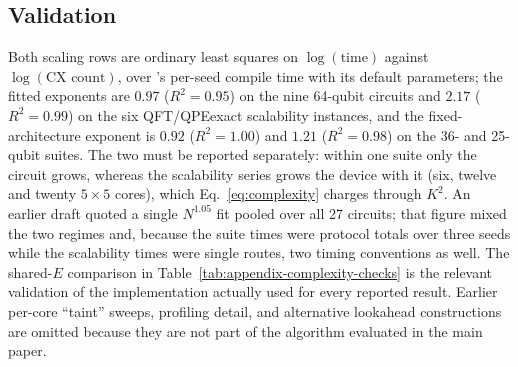 \subsection{Validation}
\label{app:complexity_valid}

\begin{table}[t]
\centering
\caption{Implementation checks supporting the complexity argument.}
\label{tab:appendix-complexity-checks}
\small
{}
\end{table}

Both scaling rows are ordinary least squares on $\log(\text{time})$
against $\log(\text{CX count})$, over \dSABRE{}'s per-seed compile time with
its default parameters; the fitted exponents are $0.97$ ($R^2=0.95$) on the
nine 64-qubit circuits and $2.17$ ($R^2=0.99$) on the six QFT/QPEexact
scalability instances, and the fixed-architecture exponent is $0.92$
($R^2=1.00$) and $1.21$ ($R^2=0.98$) on the 36- and 25-qubit suites.  The two
must be reported separately: within one suite only the circuit grows, whereas
the scalability series grows the device with it (six, twelve and twenty
$5{\times}5$ cores), which Eq.~\eqref{eq:complexity} charges through $K^2$.  An
earlier draft quoted a single $N^{1.05}$ fit pooled over all 27 circuits; that
figure mixed the two regimes and, because the suite times were protocol totals
over three seeds while the scalability times were single routes, two timing
conventions as well.  The shared-$E$ comparison in
Table~\ref{tab:appendix-complexity-checks} is the relevant validation of the
implementation actually used for every reported result.  Earlier per-core
``taint'' sweeps, profiling detail, and alternative lookahead constructions
are omitted because they are not part of the algorithm evaluated in the main
paper.

